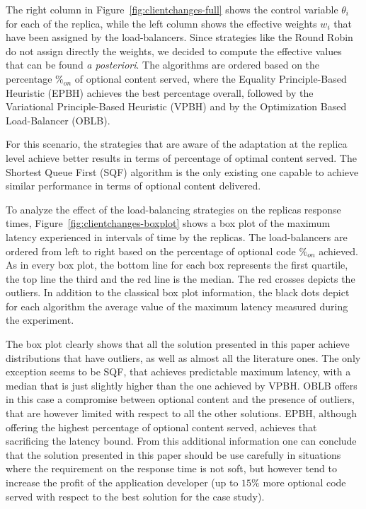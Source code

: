 The right column in Figure~\ref{fig:clientchanges-full} shows the
control variable $\theta_i$ for each of the replica, while the left
column shows the effective weights $w_i$ that have been assigned by
the load-balancers. Since strategies like the Round Robin do not
assign directly the weights, we decided to compute the effective
values that can be found \emph{a posteriori}. The algorithms are
ordered based on the percentage $\%_{on}$ of optional content served,
where the Equality Principle-Based Heuristic (EPBH) achieves the best
percentage overall, followed by the Variational Principle-Based
Heuristic (VPBH) and by the Optimization Based Load-Balancer (OBLB).

For this scenario, the strategies that are aware of the adaptation at
the replica level achieve better results in terms of percentage of
optimal content served. The Shortest Queue First (SQF) algorithm is
the only existing one capable to achieve similar performance in terms
of optional content delivered.

To analyze the effect of the load-balancing strategies on the replicas
response times, Figure~\ref{fig:clientchanges-boxplot} shows a box
plot of the maximum latency experienced in intervals of time by the
replicas. The load-balancers are ordered from left to right based on
the percentage of optional code $\%_{on}$ achieved. As in every box
plot, the bottom line for each box represents the first quartile, the
top line the third and the red line is the median. The red crosses
depicts the outliers. In addition to the classical box plot
information, the black dots depict for each algorithm the average
value of the maximum latency measured during the experiment.

The box plot clearly shows that all the solution presented in this
paper achieve distributions that have outliers, as well as almost all
the literature ones. The only exception seems to be SQF, that achieves
predictable maximum latency, with a median that is just slightly
higher than the one achieved by VPBH. OBLB offers in this case a
compromise between optional content and the presence of outliers, that
are however limited with respect to all the other solutions. EPBH,
although offering the highest percentage of optional content served,
achieves that sacrificing the latency bound. From this additional
information one can conclude that the solution presented in this paper
should be use carefully in situations where the requirement on the
response time is not soft, but however tend to increase the profit of
the application developer (up to $15\%$ more optional code served with
respect to the best solution for the case study).

